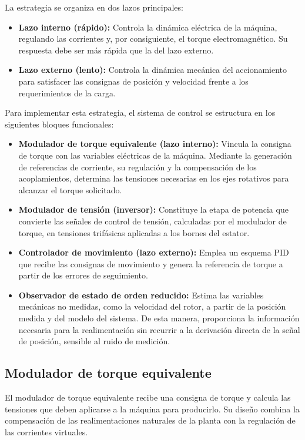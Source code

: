 \documentclass[blue,fullpaper]{ludusofficial}  %
\begin{document}
La estrategia se organiza en dos lazos principales:

\begin{itemize}
    \item \textbf{Lazo interno (rápido):} Controla la dinámica eléctrica de la máquina, regulando las corrientes y, por consiguiente, el torque electromagnético. Su respuesta debe ser más rápida que la del lazo externo.
    \item \textbf{Lazo externo (lento):} Controla la dinámica mecánica del accionamiento para satisfacer las consignas de posición y velocidad frente a los requerimientos de la carga.
\end{itemize}
    
Para implementar esta estrategia, el sistema de control se estructura en los siguientes bloques funcionales:

\begin{itemize}
    \item \textbf{Modulador de torque equivalente (lazo interno):} Vincula la consigna de torque con las variables eléctricas de la máquina. Mediante la generación de referencias de corriente, su regulación y la compensación de los acoplamientos, determina las tensiones necesarias en los ejes rotativos para alcanzar el torque solicitado.
    \item \textbf{Modulador de tensión (inversor):} Constituye la etapa de potencia que convierte las señales de control de tensión, calculadas por el modulador de torque, en tensiones trifásicas aplicadas a los bornes del estator.
    \item \textbf{Controlador de movimiento (lazo externo):} Emplea un esquema PID que recibe las consignas de movimiento y genera la referencia de torque a partir de los errores de seguimiento.
    \item \textbf{Observador de estado de orden reducido:} Estima las variables mecánicas no medidas, como la velocidad del rotor, a partir de la posición medida y del modelo del sistema. De esta manera, proporciona la información necesaria para la realimentación sin recurrir a la derivación directa de la señal de posición, sensible al ruido de medición.
\end{itemize}




\subsection{Modulador de torque equivalente}
El modulador de torque equivalente recibe una consigna de torque y calcula las tensiones que deben aplicarse a la máquina para producirlo. Su diseño combina la compensación de las realimentaciones naturales de la planta con la regulación de las corrientes virtuales.
\end{document}
